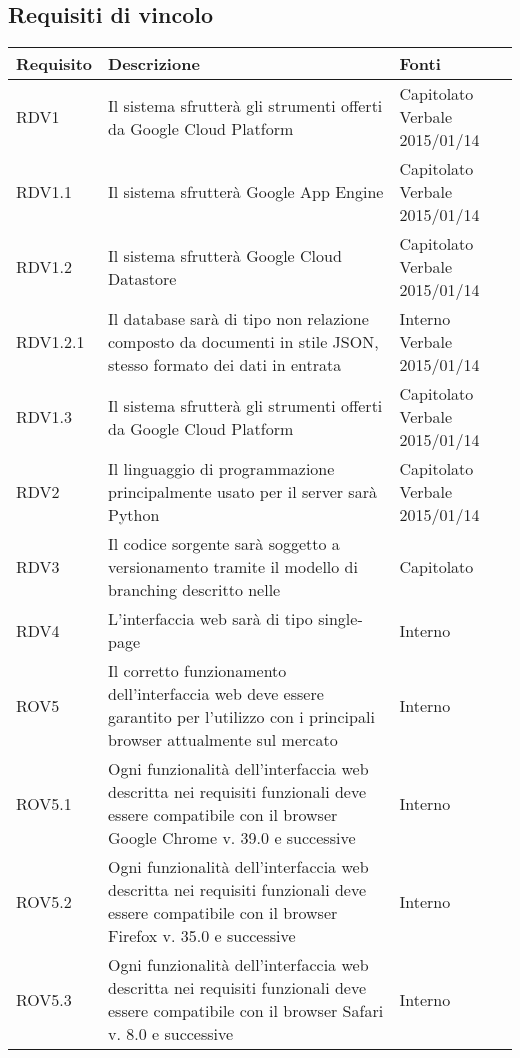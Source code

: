 \subsection{Requisiti di vincolo}

\begin{center}

	\def\arraystretch{1.5}
	\bgroup
	\begin{longtable}{| p{2cm} | p{8cm} | p{2cm} |}

		\hline
		\textbf{Requisito} & \textbf{Descrizione} & \textbf{Fonti} \\
		\hline

		RDV1  &  Il sistema sfrutterà gli strumenti offerti da Google Cloud Platform  &  Capitolato \newline Verbale 2015/01/14 \\
		\hline
		RDV1.1  &  Il sistema sfrutterà Google App Engine  &  Capitolato \newline Verbale 2015/01/14 \\
		\hline
		RDV1.2  &  Il sistema sfrutterà Google Cloud Datastore  &  Capitolato \newline Verbale 2015/01/14 \\
		\hline
		RDV1.2.1  &  Il database sarà di tipo non relazione composto da documenti in stile JSON, stesso formato dei dati in entrata  &  Interno \newline Verbale 2015/01/14 \\
		\hline
		RDV1.3  &  Il sistema sfrutterà gli strumenti offerti da Google Cloud Platform  &  Capitolato \newline Verbale 2015/01/14 \\
		\hline
		RDV2  &  Il linguaggio di programmazione principalmente usato per il server sarà Python  &  Capitolato \newline Verbale 2015/01/14 \\
		\hline
		RDV3  &  Il codice sorgente sarà soggetto a versionamento tramite il modello di branching descritto nelle \docNameVersionNdP  &  Capitolato \\
		\hline
		RDV4  &  L'interfaccia web sarà di tipo single-page  &  Interno \\
		\hline
		ROV5  &  Il corretto funzionamento dell'interfaccia web deve essere garantito per l'utilizzo con i principali browser attualmente sul mercato   &  Interno \\
		\hline
		ROV5.1  &  Ogni funzionalità dell'interfaccia web descritta nei requisiti funzionali deve essere compatibile con il browser Google Chrome v. 39.0 e successive   &  Interno \\
		\hline
		ROV5.2  &  Ogni funzionalità dell'interfaccia web descritta nei requisiti funzionali deve essere compatibile con il browser Firefox v. 35.0 e successive   &  Interno \\
		\hline
		ROV5.3  &  Ogni funzionalità dell'interfaccia web descritta nei requisiti funzionali deve essere compatibile con il browser Safari v. 8.0 e successive   &  Interno \\
		\hline


\end{longtable}
\end{center}
